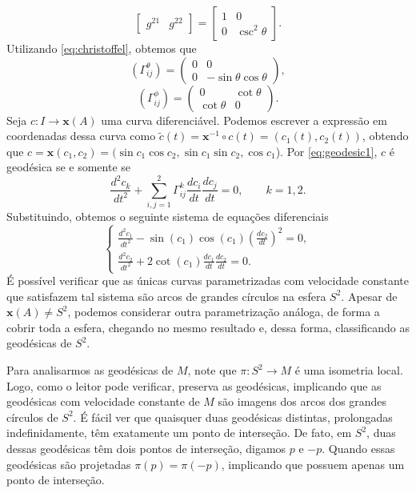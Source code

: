 \begin{example}
\begin{equation*}
\begin{bmatrix}
            g^{21} & g^{22}
        \end{bmatrix}
        = \begin{bmatrix}
            1 & 0               \\
            0 & \csc ^{2}\theta
        \end{bmatrix}.
    \end{equation*}
    Utilizando \eqref{eq:christoffel}, obtemos que
    \begin{equation*}
        \left(\Gamma^\theta_{ij}\right)= \begin{pmatrix} 0&0\\ 0&-\sin\theta\cos\theta \end{pmatrix},
    \end{equation*}
    \begin{equation*}
        \left(\Gamma^\phi_{ij}\right)= \begin{pmatrix} 0&\cot\theta\\ \cot\theta&0 \end{pmatrix}.
    \end{equation*}
    Seja $c:I\to \mathbf{x}(A)$ uma curva diferenciável. Podemos escrever a expressão em coordenadas dessa curva como $\tilde{c}(t)=\mathbf{x}^{-1} \circ c(t)=(c_{1}(t),c_{2}(t))$, obtendo que $c=\mathbf{x} (c_{1},c_{2})= (\sin c_{1}\cos c_{2}, \sin c_{1}\sin c_{2}, \cos c_{1}$).
    Por \eqref{eq:geodesic1}, $c$ é geodésica se e somente se
    \begin{equation*}
        \frac{d^2c_k}{dt^2} +\sum_{i,j=1}^{2}\Gamma_{ij}^{k} \frac{dc_i}{dt}\frac{dc_j}{dt}=0, \qquad k=1,2.
    \end{equation*}
    Substituindo, obtemos o seguinte sistema de equações diferenciais
    \begin{equation*}
        \begin{cases}
            \displaystyle \frac{d^2c_1}{dt^2} -\sin(c_1)\cos(c_1) \left(\frac{dc_2}{dt}\right)^2=0, \\[12pt] \displaystyle \frac{d^2c_2}{dt^2} +2\cot(c_1) \frac{dc_1}{dt}\frac{dc_2}{dt}=0.
        \end{cases}
    \end{equation*}
    É possível verificar que as únicas curvas parametrizadas com velocidade constante que satisfazem tal sistema são arcos de grandes círculos na esfera $S^{2}$. Apesar de $\mathbf{x}(A)\neq S^{2}$, podemos considerar outra parametrização análoga, de forma a cobrir toda a esfera, chegando no mesmo resultado e, dessa forma, classificando as geodésicas de $S^{2}$.

    Para analisarmos as geodésicas de $M$, note que $\pi:S^{2}\to M$ é uma isometria local. Logo, como o leitor pode verificar, preserva as geodésicas, implicando que as geodésicas com velocidade constante de $M$ são imagens dos arcos dos grandes círculos de $S^{2}$. É fácil ver que quaisquer duas geodésicas distintas, prolongadas indefinidamente, têm exatamente um ponto de interseção. De fato, em $S^{2}$, duas dessas geodésicas têm dois pontos de interseção, digamos $p$ e $-p$. Quando essas geodésicas são projetadas $\pi(p)=\pi(-p)$, implicando que possuem apenas um ponto de interseção.
\end{example}
